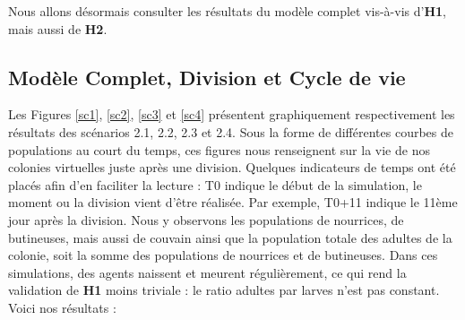 	Nous allons désormais consulter les résultats du modèle complet vis-à-vis d'\textbf{H1}, mais aussi de \textbf{H2}.
	
	\subsection{Modèle Complet, Division et Cycle de vie}
	
	
	Les Figures \ref{sc1}, \ref{sc2}, \ref{sc3} et \ref{sc4} présentent graphiquement respectivement les résultats des scénarios 2.1, 2.2, 2.3 et 2.4. Sous la forme de différentes courbes de populations au court du temps, ces figures nous renseignent sur la vie de nos colonies virtuelles juste après une division. Quelques indicateurs de temps ont été placés afin d'en faciliter la lecture : T0 indique le début de la simulation, le moment ou la division vient d'être réalisée. Par exemple, T0+11 indique le 11ème jour après la division. Nous y observons les populations de nourrices, de butineuses, mais aussi de couvain ainsi que la population totale des adultes de la colonie, soit la somme des populations de nourrices et de butineuses. Dans ces simulations, des agents naissent et meurent régulièrement, ce qui rend la validation de \textbf{H1} moins triviale : le ratio adultes par larves n'est pas constant. Voici nos résultats :
		
